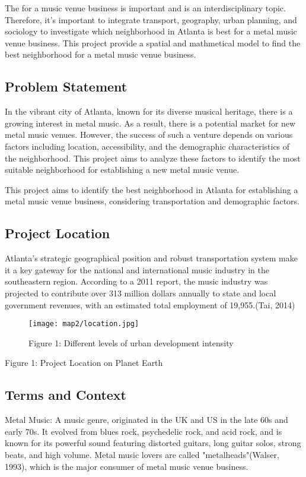 \documentclass[11pt]{article}
\begin{document}
The  for a music venue business is important and is an interdisciplinary topic. Therefore, it's important to integrate transport, geography, urban planning, and sociology to investigate which neighborhood in Atlanta is best for a metal music venue business. This project provide a spatial and mathmetical model to find the best neighborhood for a metal music venue business.

\subsection{Problem Statement}
In the vibrant city of Atlanta, known for its diverse musical heritage, there is a growing interest in metal music. As a result, there is a potential market for new metal music venues. However, the success of such a venture depends on various factors including location, accessibility, and the demographic characteristics of the neighborhood. This project aims to analyze these factors to identify the most suitable neighborhood for establishing a new metal music venue.

This project aims to identify the best neighborhood in Atlanta for establishing a metal music venue business, considering transportation and demographic factors.

\subsection{Project Location}
Atlanta’s strategic geographical position and robust transportation system make it a key gateway for the national and international music industry in the southeastern region. According to a 2011 report, the music industry was projected to contribute over 313 million dollars annually to state and local government revenues, with an estimated total employment of 19,955.(Tai, 2014)

\begin{figure}[H]
\begin{center}
\centering
\texttt{[image: map2/location.jpg]}
\caption{Figure 1: Different levels of urban development intensity}
\label{fig:figure1}
\end{center}
\end{figure}

\begin{center}
\centering
Figure 1: Project Location on Planet Earth
\end{center}


\subsection{Terms and Context}
Metal Music: A music genre, originated in the UK and US in the late 60s and early 70s. It evolved from blues rock, psychedelic rock, and acid rock, and is known for its powerful sound featuring distorted guitars, long guitar solos, strong beats, and high volume. Metal music lovers are called "metalheads"(Walser, 1993), which is the major consumer of metal music venue business.
\end{document}
